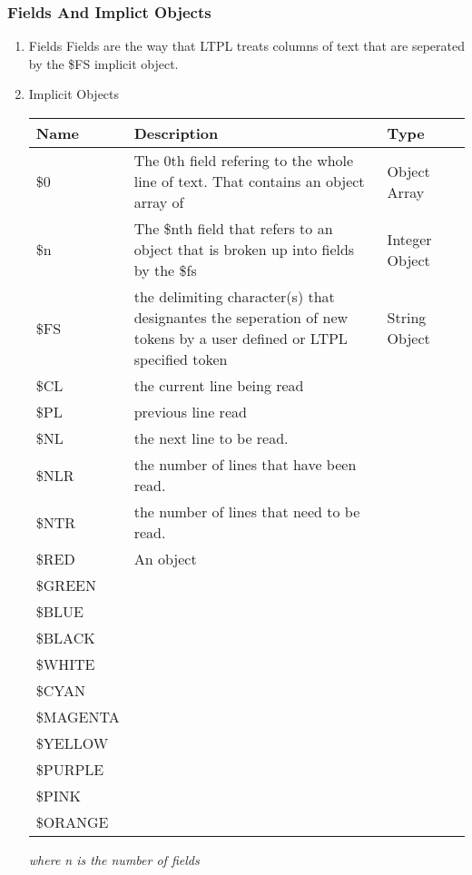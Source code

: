 \documentclass[11pt]{article}
\begin{document}
\subsubsection{Fields And Implict Objects}
\label{sec:org1277496}
\begin{enumerate}
\item Fields
\label{sec:orgdbbbbe4}
Fields are the way that LTPL treats columns of text that are seperated by the \$FS implicit object.
\item Implicit Objects
\label{sec:orgd55f964}
\begin{center}
\begin{tabular}{llll}
\hline
Name & Description & Type & \\
\hline
\$0 & The 0th field refering to the whole line of text. That contains an object array of & Object Array & \\
\hline
\$n & The \$nth field that refers to an object that is broken up into fields by the \$fs & Integer Object & \\
\hline
\$FS & the delimiting character(s) that designantes the seperation of new tokens by a user defined or LTPL specified token & String Object & \\
\hline
\$CL & the current line being read &  & \\
\hline
\$PL & previous line read &  & \\
\hline
\$NL & the next line to be read. &  & \\
\hline
\$NLR & the number of lines that have been read. &  & \\
\hline
\$NTR & the number of lines that need to be read. &  & \\
\hline
\$RED & An object &  & \\
\hline
\$GREEN &  &  & \\
\hline
\$BLUE &  &  & \\
\hline
\$BLACK &  &  & \\
\hline
\$WHITE &  &  & \\
\hline
\$CYAN &  &  & \\
\hline
\$MAGENTA &  &  & \\
\hline
\$YELLOW &  &  & \\
\hline
\$PURPLE &  &  & \\
\hline
\$PINK &  &  & \\
\hline
\$ORANGE &  &  & \\
\hline
\end{tabular}
\end{center}


\emph{where n is the number of fields}
\end{enumerate}
\end{document}
